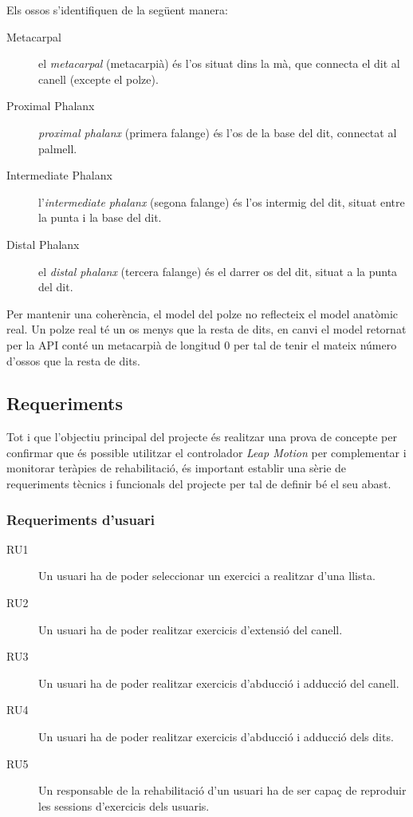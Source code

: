 \documentclass[12pt,a4paper,catalan]{article}
\begin{document}
	Els ossos s'identifiquen de la següent manera:
	\begin{description}
		\item[Metacarpal] el \textit{metacarpal} (metacarpià) és l'os situat dins la mà, que connecta el dit al canell (excepte el polze).
		\item[Proximal Phalanx] \textit{proximal phalanx} (primera falange) és l'os de la base del dit, connectat al palmell.
		\item[Intermediate Phalanx] l'\textit{intermediate phalanx} (segona falange) és l'os intermig del dit, situat entre la punta i la base del dit.
		\item[Distal Phalanx] el \textit{distal phalanx} (tercera falange) és el darrer os del dit, situat a la punta del dit.
	\end{description}
	Per mantenir una coherència, el model del polze no reflecteix el model anatòmic real. Un polze real té un os menys que la resta de dits, en canvi el model retornat per la API conté un metacarpià de longitud 0 per tal de tenir el mateix número d'ossos que la resta de dits.
	\subsection{Requeriments}
	Tot i que l'objectiu principal del projecte és realitzar una prova de concepte per confirmar que és possible utilitzar el controlador \textit{Leap Motion} per complementar i monitorar teràpies de rehabilitació, és important establir una sèrie de requeriments tècnics i funcionals del projecte per tal de definir bé el seu abast.
	\subsubsection*{Requeriments d'usuari}
	\begin{description}
		\item [RU1] Un usuari ha de poder seleccionar un exercici a realitzar d'una llista.
		\item [RU2] Un usuari ha de poder realitzar exercicis d'extensió del canell.
		\item [RU3] Un usuari ha de poder realitzar exercicis d'abducció i adducció del canell.
		\item [RU4] Un usuari ha de poder realitzar exercicis d'abducció i adducció dels dits.
		\item [RU5] Un responsable de la rehabilitació d'un usuari ha de ser capaç de reproduir les sessions d'exercicis dels usuaris.
	\end{description}
\end{document}
